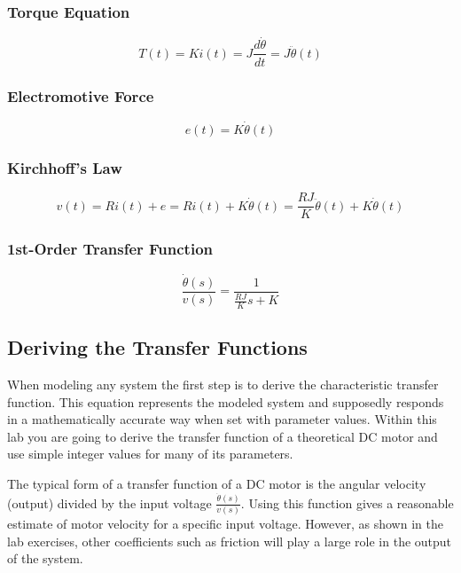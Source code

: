 \documentclass[openany,11pt,fleqn]{book} %
\begin{document}
\subsubsection{Torque Equation}
\begin{equation}
T(t) = Ki(t) = J\frac{d\dot{\theta}}{dt}=J\ddot{\theta}(t) 
\end{equation}

\subsubsection{Electromotive Force}
\begin{equation}
e(t) = K\dot{\theta}(t)
\end{equation}

\subsubsection{Kirchhoff's Law}
\begin{equation}
v(t) = Ri(t) + e = Ri(t) + K\dot{\theta}(t) = \frac{RJ}{K}\ddot{\theta}(t)+K\dot{\theta}(t)
\end{equation}

\subsubsection{1st-Order Transfer Function}
\begin{equation}
\frac{\dot{\theta}(s)}{v(s)} = \frac{1}{\frac{RJ}{K}s+K}
\end{equation}


   
\subsection{Deriving the Transfer Functions}
When modeling any system the first step is to derive the characteristic transfer function. This equation represents the modeled system and supposedly responds in a mathematically accurate way when set with parameter values. Within this lab you are going to derive the transfer function of a theoretical DC motor and use simple integer values for many of its parameters. 

The typical form of a transfer function of a DC motor is the angular velocity (output) divided by the input voltage $\frac{\dot{\theta}(s)}{v(s)}$. Using this function gives a reasonable estimate of motor velocity for a specific input voltage. However, as shown in the lab exercises, other coefficients such as friction will play a large role in the output of the system. 
\end{document}
